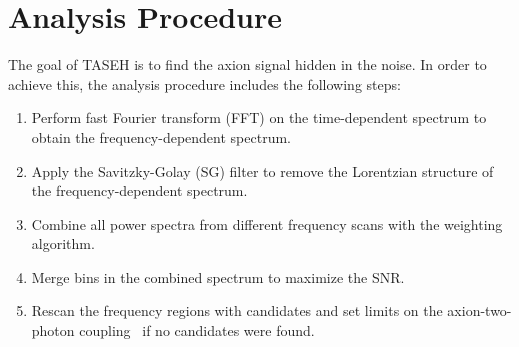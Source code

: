 \section{Analysis Procedure} \label{sec:ana}
The goal of TASEH is to find the axion signal hidden in the noise. In 
order to achieve this, the analysis procedure includes the following steps:
    \begin{enumerate}
        \item Perform fast Fourier transform (FFT) on the 
time-dependent spectrum to obtain the frequency-dependent spectrum.
        \item Apply the Savitzky-Golay (SG) filter to remove the 
Lorentzian structure of the frequency-dependent spectrum.
        \item Combine all power spectra from different frequency scans with 
the weighting algorithm.
        \item Merge bins in the combined spectrum to maximize the SNR. 
       \item Rescan the frequency regions with candidates and set limits on 
      the axion-two-photon coupling \gagg\ if no candidates were found.
    \end{enumerate}

